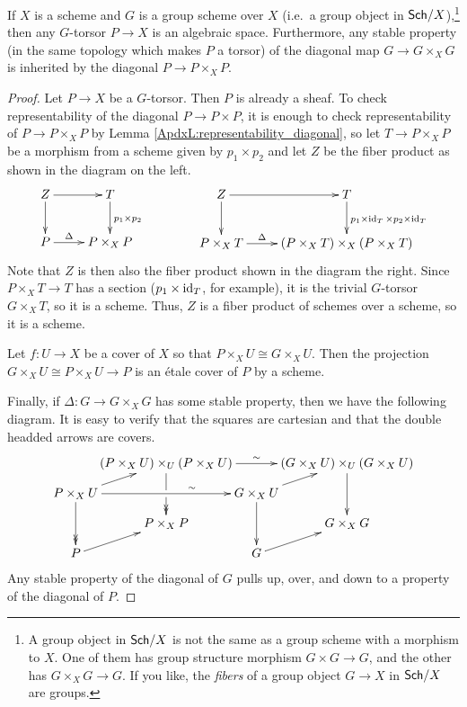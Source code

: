 \begin{lemma}
 If $X$ is a scheme and $G$ is a group scheme over $X$ (i.e.~a group object in $\text{\sf Sch}/X$),\footnote{A group object in $\text{\sf Sch}/X$ is not the same as a group scheme with a morphism to $X$. One of them has group structure morphism $G\times G\to G$, and the other has $G\times_X G\to G$. If you like, the \emph{fibers} of a group object $G\to X$ in $\text{\sf Sch}/X$ are groups.} then any $G$-torsor $P\to X$ is an algebraic space. Furthermore, any stable property (in the same topology which makes $P$ a torsor) of the diagonal map $G\to G\times_X G$ is inherited by the diagonal $P\to P\times_X P$.
\end{lemma}
\begin{proof}
 Let $P\to X$ be a $G$-torsor. Then $P$ is already a sheaf. To check representability of the diagonal $P\to P\times P$, it is enough to check representability of $P\to P\times_X P$ by Lemma \ref{ApdxL:representability_diagonal}, so let $T\to P\times_X P$ be a morphism from a scheme given by $p_1\times p_2$ and let $Z$ be the fiber product as shown in the diagram on the left.
 \[\xymatrix{
  Z\ar[r]\ar[d] & T\ar[d]^{p_1\times p_2}\\
  P\ar[r]^<>(.5)\Delta & P\times_X P 
 }\qquad\qquad\xymatrix{
  Z\ar[r]\ar[d] & T\ar[d]^{p_1\times\id_T\times p_2\times \id_T}\\
  P\times_X T\ar[r]^<>(.5)\Delta & (P\times_X T)\times_X (P\times_X T) 
 }\]
 Note that $Z$ is then also the fiber product shown in the diagram the right. Since $P\times_X T\to T$ has a section ($p_1\times \operatorname{id}_T$, for example), it is the trivial $G$-torsor $G\times_X T$, so it is a scheme. Thus, $Z$ is a fiber product of schemes over a scheme, so it is a scheme.

 Let $f:U\to X$ be a cover of $X$ so that $P\times_X U\cong G\times_X U$. Then the projection $G\times_X U\cong P\times_X U \to P$ is an \'etale cover of $P$ by a scheme.

 Finally, if $\Delta:G\to G\times_X G$ has some stable property, then we have the following diagram. It is easy to verify that the squares are cartesian and that the double headded arrows are covers.
 \[\xymatrix@!0 @C=6pc @R=2pc{
  & (P\times_X U)\times_U (P\times_X U) \ar@{->>}[dd]|\hole \ar[rr]^<>(.5)\sim & & (G\times_X U)\times_U (G\times_X U) \ar[dd]\\
  P\times_X U\ar[ur] \ar@{->>}[dd]\ar[rr]^<>(.7)\sim & & G\times_X U\ar[dd] \ar[ur]\\
  & P\times_X P & & G\times_X G\\
  P\ar[ur] & & G\ar[ur]
 }\]
 Any stable property of the diagonal of $G$ pulls up, over, and down to a property of the diagonal of $P$.
\end{proof}
